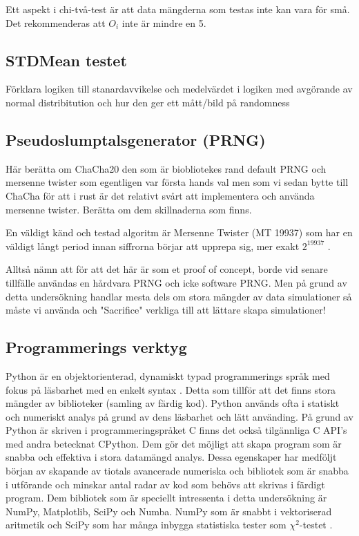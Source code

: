 \documentclass[swedish,a4paper]{article}
\begin{document}
Ett aspekt i chi-två-test är att data mängderna som testas inte kan vara för små. Det rekommenderas att $O_i$ inte är mindre en 5.

\subsection{STDMean testet}
Förklara logiken till stanardavvikelse och medelvärdet
i logiken med avgörande av normal distribitution och hur den ger ett mått/bild på randomness

\subsection{Pseudoslumptalsgenerator (PRNG)}
Här berätta om ChaCha20 \parencite{chacha} den som är biobliotekes rand
\parencite{rand_crate} default PRNG och mersenne twister som egentligen var första
hands val
\parencite{mersenne_twister} men som vi sedan bytte till ChaCha för att i rust
är det relativt svårt att  implementera och använda mersenne twister. Berätta om
dem skillnaderna som finns.


En väldigt känd och testad algoritm är Mersenne Twister (MT 19937) som
har en väldigt långt period innan siffrorna börjar att upprepa sig, mer
exakt $2^{19937}$ \parencite{mersenne_twister}.

Alltså nämn att för att det här är som et proof of concept, borde vid
senare tillfälle användas en hårdvara PRNG och icke software PRNG.
Men på grund av detta undersökning handlar mesta dels om stora mängder av data
simulationer så måste vi använda och "Sacrifice" verkliga till att lättare
skapa simulationer!

\subsection{Programmerings verktyg}
Python är en objektorienterad, dynamiskt typad programmerings språk med
fokus på läsbarhet med en enkelt syntax \parencite{python}. Detta  som tillför att det finns stora
mängder av biblioteker (samling av färdig kod).
Python används ofta i statiskt och numeriskt analys på grund av dens
läsbarhet och lätt använding. På grund av Python är skriven i
programmeringspråket C finns det också tilgännliga C API's med andra
betecknat CPython. Dem gör det möjligt att skapa program som är snabba
och effektiva i stora datamängd analys. Dessa egenskaper har medföljt
början av skapande av tiotals avancerade numeriska och
bibliotek som är snabba i utförande och minskar antal radar av kod som
behövs att skrivas i färdigt program. Dem bibliotek som är speciellt
intressenta i detta undersökning är NumPy, Matplotlib, SciPy och Numba.
NumPy som är snabbt i vektoriserad aritmetik och SciPy som har många
inbygga statistiska tester som $\chi^2$-testet \parencite{numpy, scipy}.
\end{document}
